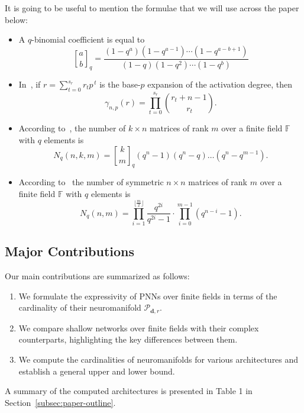 \documentclass[a4paper]{cas-sc}
\newcommand{\dd}{\mathbf{d}}    %
\newcommand{\F}{\mathbb{F}}
\newcommand{\qbinom}[2]{\genfrac{[}{]}{0pt}{}{#1}{#2}_q}
\begin{document}
It is going to be useful to mention the formulae that we will use across the paper below: 
\begin{itemize}
    \item A $q$-binomial coefficient is equal to
    \begin{equation}
    \label{eq:q-binomial-coefficient}
        \qbinom{a}{b} = \frac{(1-q^a) (1-q^{a-1}) \cdots (1-q^{a-b+1})}{(1-q) (1-q^2) \cdots (1-q^b)}
    \end{equation}
    \item In~\citep{CONRAD1995}, if $r =\sum_{t=0}^{s_r} r_t p^{\,t}$ is the base-$p$ expansion of the activation degree, then 
    \begin{equation}
    \label{eq: upper bound exponent}
        \gamma_{n,p}(r)=\prod_{t=0}^{s_r}\binom{r_t+n-1}{\,r_t}.
    \end{equation}
    \item According to~\citet[Section~1.7]{MORRISON06}, the number of $k\times n$ matrices of rank $m$ over a finite field $\F$ with $q$ elements is
    \begin{equation}
    \label{eq: k x n matrices of rank m}
        N_{q}(n,k,m)=\qbinom{k}{m}(q^n-1)(q^n-q)\dots(q^n-q^{m-1}).
    \end{equation}
    \item According to~\citet[Section~2]{WILLIAMS69} the number of symmetric $n \times n$ matrices of rank $m$ over a finite field $\F$ with $q$ elements is
    \begin{equation}
    \label{eq: n x n symmetric matrices of rank m}
        N_q(n,m) = \prod_{i = 1}^{\lfloor{\frac{m}{2}}\rfloor}\frac{q^{2i}}{q^{2i} - 1} \cdot \prod_{i = 0}^{m - 1} (q^{n - i} - 1).
    \end{equation}
\end{itemize}

\subsection{Major Contributions}
    Our main contributions are summarized as follows:
    \begin{enumerate}
        \item We formulate the expressivity of PNNs over finite fields in terms of the cardinality of their neuromanifold $\mathcal{P}_{\dd,r}$.
        \item We compare shallow networks over finite fields with their complex counterparts, highlighting the key differences between them.
        \item We compute the cardinalities of neuromanifolds for various architectures and establish a general upper and lower bound.
    \end{enumerate}
    A summary of the computed architectures is presented in Table 1 in Section~\ref{subsec:paper-outline}.
\end{document}
